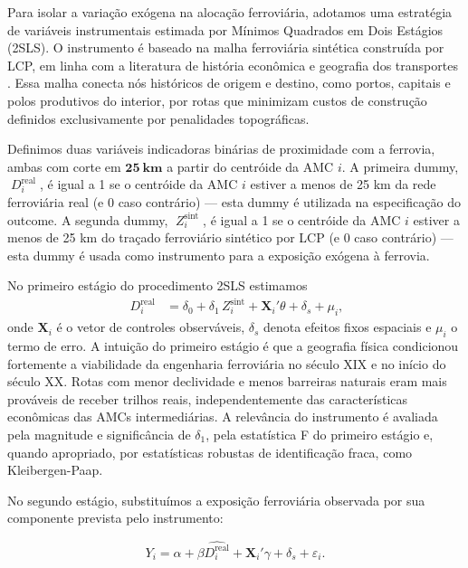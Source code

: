 \documentclass[12pt,a4paper]{article}
\begin{document}
Para isolar a variação exógena na alocação ferroviária, adotamos uma estratégia de variáveis instrumentais estimada por Mínimos Quadrados em Dois Estágios (2SLS). O instrumento é baseado na malha ferroviária sintética construída por LCP, em linha com a literatura de história econômica e geografia dos transportes \citep{fogel1964,donaldson2018,berger2017}. Essa malha conecta nós históricos de origem e destino, como portos, capitais e polos produtivos do interior, por rotas que minimizam custos de construção definidos exclusivamente por penalidades topográficas.

Definimos duas variáveis indicadoras binárias de proximidade com a ferrovia, ambas com corte em \(\mathbf{25\ km}\) a partir do centróide da AMC \(i\).
A primeira dummy, \(\;D^{\mathrm{real}}_{i}\;\), é igual a 1 se o centróide da AMC \(i\) estiver a menos de 25 km da rede ferroviária real (e 0 caso contrário) — esta dummy é utilizada na especificação do outcome.
A segunda dummy, \(\;Z^{\mathrm{sint}}_{i}\;\), é igual a 1 se o centróide da AMC \(i\) estiver a menos de 25 km do traçado ferroviário sintético por LCP (e 0 caso contrário) — esta dummy é usada como instrumento para a exposição exógena à ferrovia.

No primeiro estágio do procedimento 2SLS estimamos
\begin{align}
\;D^{\mathrm{real}}_{i} &= \delta_{0} + \delta_{1}\,Z^{\mathrm{sint}}_{i} + \mathbf{X}_{i}'\theta + \delta_{s} + \mu_{i},
\end{align}
onde \(\mathbf{X}_{i}\) é o vetor de controles observáveis, \(\delta_{s}\) denota efeitos fixos espaciais e \(\mu_{i}\) o termo de erro.
\noindent A intuição do primeiro estágio é que a geografia física condicionou fortemente a viabilidade da engenharia ferroviária no século XIX e no início do século XX. Rotas com menor declividade e menos barreiras naturais eram mais prováveis de receber trilhos reais, independentemente das características econômicas das AMCs intermediárias. A relevância do instrumento é avaliada pela magnitude e significância de $\delta_1$, pela estatística F do primeiro estágio e, quando apropriado, por estatísticas robustas de identificação fraca, como Kleibergen-Paap.


No segundo estágio, substituímos a exposição ferroviária observada por sua componente prevista pelo instrumento:

\begin{equation}
Y_i = \alpha + \beta \widehat{D^{\mathrm{real}}_{i}} + \mathbf{X}_i'\gamma + \delta_s + \varepsilon_i.
\end{equation}
\end{document}
